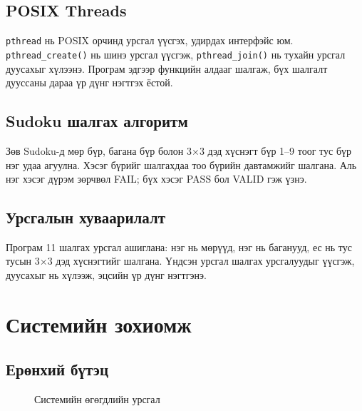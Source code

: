 \documentclass[12pt,a4paper]{report}
\begin{document}
\section{POSIX Threads}
\texttt{pthread} нь POSIX орчинд урсгал үүсгэх, удирдах интерфэйс юм. \texttt{pthread\_create()} нь шинэ урсгал үүсгэж, \texttt{pthread\_join()} нь тухайн урсгал дуусахыг хүлээнэ. Програм эдгээр функцийн алдааг шалгаж, бүх шалгалт дууссаны дараа үр дүнг нэгтгэх ёстой.
\section{Sudoku шалгах алгоритм}
Зөв Sudoku-д мөр бүр, багана бүр болон 3$\times$3 дэд хүснэгт бүр 1--9 тоог тус бүр нэг удаа агуулна. Хэсэг бүрийг шалгахдаа тоо бүрийн давтамжийг шалгана. Аль нэг хэсэг дүрэм зөрчвөл FAIL; бүх хэсэг PASS бол VALID гэж үзнэ.
\section{Урсгалын хуваарилалт}
Програм 11 шалгах урсгал ашиглана: нэг нь мөрүүд, нэг нь баганууд, ес нь тус тусын 3$\times$3 дэд хүснэгтийг шалгана. Үндсэн урсгал шалгах урсгалуудыг үүсгэж, дуусахыг нь хүлээж, эцсийн үр дүнг нэгтгэнэ.

\chapter{Системийн зохиомж}
\section{Ерөнхий бүтэц}
\begin{figure}[H]\centering{}\caption{Системийн өгөгдлийн урсгал}\end{figure}
\end{document}
